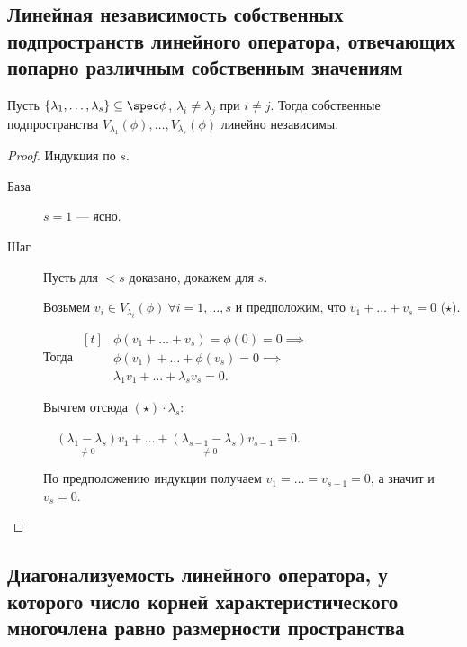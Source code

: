 \subsection{Линейная независимость собственных подпространств линейного оператора, отвечающих попарно различным собственным значениям}

\begin{proposal}
    Пусть $ \{\lambda_1, \dots, \lambda_s\} \subseteq \spec \phi$, $\lambda_i \neq \lambda_j$ при $i \neq j$. Тогда собственные подпространства $V_{\lambda_1}(\phi), \dots, V_{\lambda_s}(\phi)$ линейно независимы.
\end{proposal}

\begin{proof}
    Индукция по $s$.
    \begin{description}
    \item[База] $s = 1$ --- ясно.
    \item[Шаг] Пусть для $< s$ доказано, докажем для $s$.

        Возьмем $v_i \in V_{\lambda_i}(\phi) \ \forall i = 1, \dots, s$ и предположим, что $v_1 + \dots + v_s = 0$ ($\star$).

        Тогда 
        \begin{math}
            \begin{aligned}[t]
                &\phi(v_1 + \dots + v_s) = \phi(0) = 0 \implies \\ 
                &\phi(v_1) + \dots + \phi(v_s) = 0 \implies \\
                &\lambda_1 v_1 + \dots + \lambda_s v_s = 0.
            \end{aligned}
        \end{math}

        Вычтем отсюда $(\star) \cdot \lambda_s$:

        \begin{math}
            \quad \underset{\neq 0}{(\lambda_1 - \lambda_s)} v_1 + \dots + \underset{\neq 0}{(\lambda_{s - 1} - \lambda_s)} v_{s - 1} = 0.
        \end{math}

        По предположению индукции получаем $v_1 = \dots = v_{s - 1} = 0$, а значит и $v_s = 0$.
        \qedhere
    \end{description}
\end{proof}


\subsection{Диагонализуемость линейного оператора, у которого число корней характеристического многочлена равно размерности пространства}

